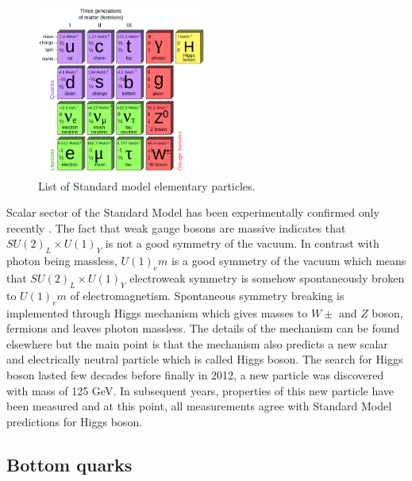 \begin{figure}[htbp]
	\centering
		\includegraphics[width=0.5\textwidth]{Figures/Elementary_Particles.png}
	\caption[List of Standard model elementary particles]{List of Standard model elementary particles.}
	\label{fig:SM_particles}
\end{figure} 
\par Scalar sector of the Standard Model has been experimentally confirmed only recently \cite{Aad:2012tfa,Chatrchyan:2012ufa}. The fact that weak gauge bosons are massive indicates that $SU(2)_L \times U(1)_Y$ is not a good symmetry of the vacuum. In contrast with photon being massless, $U(1)_em$ is a good symmetry of the vacuum which means that $SU(2)_L \times U(1)_Y$ electroweak symmetry is somehow spontaneously broken to $U(1)_em$ of electromagnetism. Spontaneous symmetry breaking is implemented through Higgs mechanism which gives masses to $W\pm$ and $Z$ boson, fermions and leaves photon massless. The details of the mechanism can be found elsewhere \cite{Griffiths:1987tj} but the main point is that the mechanism also predicts a new scalar and electrically neutral particle which is called Higgs boson. The search for Higgs boson lasted few decades before finally in 2012, a new particle was discovered with mass of 125 GeV. In subsequent years, properties of this new particle have been measured and at this point, all measurements agree with Standard Model predictions for Higgs boson.    
   


\subsection{Bottom quarks}

